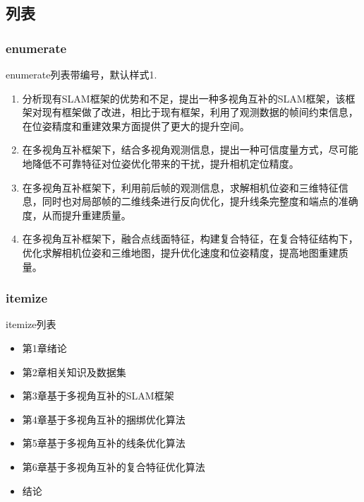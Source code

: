 \subsection{列表}

\subsubsection{enumerate}
enumerate列表带编号，默认样式1.

\begin{enumerate}[1)]
	\item 分析现有SLAM框架的优势和不足，提出一种多视角互补的SLAM框架，该框架对现有框架做了改进，相比于现有框架，利用了观测数据的帧间约束信息，在位姿精度和重建效果方面提供了更大的提升空间。
	\item 在多视角互补框架下，结合多视角观测信息，提出一种可信度量方式，尽可能地降低不可靠特征对位姿优化带来的干扰，提升相机定位精度。
	\item 在多视角互补框架下，利用前后帧的观测信息，求解相机位姿和三维特征信息，同时也对局部帧的二维线条进行反向优化，提升线条完整度和端点的准确度，从而提升重建质量。
	\item 在多视角互补框架下，融合点线面特征，构建复合特征，在复合特征结构下，优化求解相机位姿和三维地图，提升优化速度和位姿精度，提高地图重建质量。
\end{enumerate}

\subsubsection{itemize}
itemize列表

\begin{itemize}
\item 第1章\quad 绪论

\item 第2章\quad 相关知识及数据集

\item 第3章\quad 基于多视角互补的SLAM框架

\item 第4章\quad 基于多视角互补的捆绑优化算法

\item 第5章\quad 基于多视角互补的线条优化算法

\item 第6章\quad 基于多视角互补的复合特征优化算法

\item 结论

\end{itemize}

\bjutclearpage